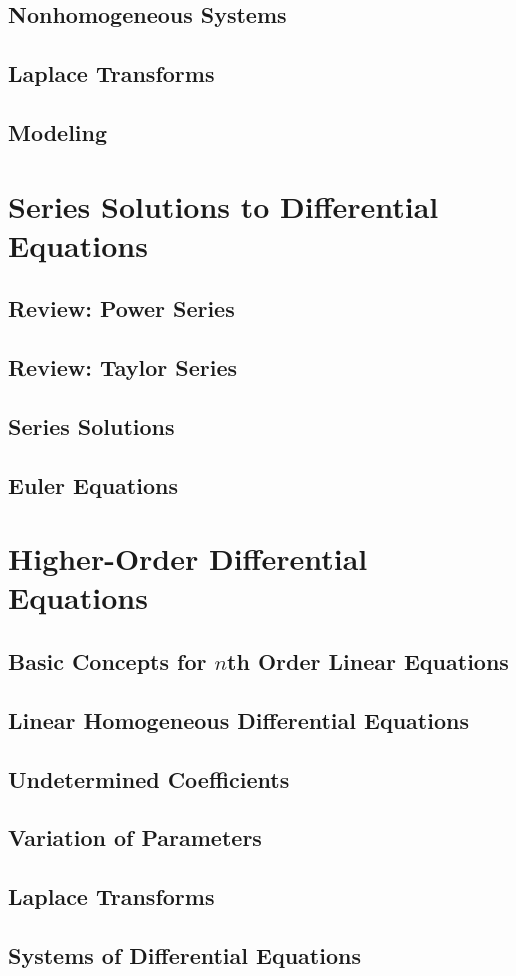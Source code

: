 \documentclass[12pt]{book}
\begin{document}
\section{Nonhomogeneous Systems}
\section{Laplace Transforms}
\section{Modeling}

\chapter{Series Solutions to Differential Equations}
\section{Review: Power Series}
\section{Review: Taylor Series}
\section{Series Solutions}
\section{Euler Equations}

\chapter{Higher-Order Differential Equations}
\section{Basic Concepts for \(n\)th Order Linear Equations}
\section{Linear Homogeneous Differential Equations}
\section{Undetermined Coefficients}
\section{Variation of Parameters}
\section{Laplace Transforms}
\section{Systems of Differential Equations}

\backmatter
\end{document}
